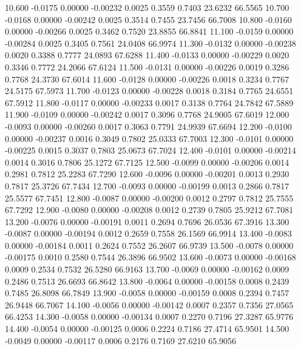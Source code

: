   10.600  -0.0175   0.00000  -0.00232   0.0025   0.3559   0.7403  23.6232  66.5565
  10.700  -0.0168   0.00000  -0.00242   0.0025   0.3514   0.7455  23.7456  66.7008
  10.800  -0.0160   0.00000  -0.00266   0.0025   0.3462   0.7520  23.8855  66.8841
  11.100  -0.0159   0.00000  -0.00284   0.0025   0.3405   0.7561  24.0408  66.9974
  11.300  -0.0132   0.00000  -0.00238   0.0020   0.3388   0.7777  24.0893  67.6288
  11.400  -0.0133   0.00000  -0.00229   0.0020   0.3346   0.7772  24.2066  67.6124
  11.500  -0.0131   0.00000  -0.00226   0.0019   0.3286   0.7768  24.3730  67.6014
  11.600  -0.0128   0.00000  -0.00226   0.0018   0.3234   0.7767  24.5175  67.5973
  11.700  -0.0123   0.00000  -0.00228   0.0018   0.3184   0.7765  24.6551  67.5912
  11.800  -0.0117   0.00000  -0.00233   0.0017   0.3138   0.7764  24.7842  67.5889
  11.900  -0.0109   0.00000  -0.00242   0.0017   0.3096   0.7768  24.9005  67.6019
  12.000  -0.0093   0.00000  -0.00260   0.0017   0.3063   0.7791  24.9939  67.6694
  12.200  -0.0100   0.00000  -0.00237   0.0016   0.3049   0.7802  25.0333  67.7003
  12.300  -0.0101   0.00000  -0.00225   0.0015   0.3037   0.7803  25.0673  67.7024
  12.400  -0.0101   0.00000  -0.00214   0.0014   0.3016   0.7806  25.1272  67.7125
  12.500  -0.0099   0.00000  -0.00206   0.0014   0.2981   0.7812  25.2283  67.7290
  12.600  -0.0096   0.00000  -0.00201   0.0013   0.2930   0.7817  25.3726  67.7434
  12.700  -0.0093   0.00000  -0.00199   0.0013   0.2866   0.7817  25.5577  67.7451
  12.800  -0.0087   0.00000  -0.00200   0.0012   0.2797   0.7812  25.7555  67.7292
  12.900  -0.0080   0.00000  -0.00208   0.0012   0.2739   0.7805  25.9212  67.7081
  13.200  -0.0076   0.00000  -0.00191   0.0011   0.2694   0.7696  26.0536  67.3916
  13.300  -0.0087   0.00000  -0.00194   0.0012   0.2659   0.7558  26.1569  66.9914
  13.400  -0.0083   0.00000  -0.00184   0.0011   0.2624   0.7552  26.2607  66.9739
  13.500  -0.0078   0.00000  -0.00175   0.0010   0.2580   0.7544  26.3896  66.9502
  13.600  -0.0073   0.00000  -0.00168   0.0009   0.2534   0.7532  26.5280  66.9163
  13.700  -0.0069   0.00000  -0.00162   0.0009   0.2486   0.7513  26.6693  66.8642
  13.800  -0.0064   0.00000  -0.00158   0.0008   0.2439   0.7485  26.8098  66.7849
  13.900  -0.0058   0.00000  -0.00159   0.0008   0.2394   0.7457  26.9448  66.7067
  14.100  -0.0056   0.00000  -0.00142   0.0007   0.2357   0.7356  27.0565  66.4253
  14.300  -0.0058   0.00000  -0.00134   0.0007   0.2270   0.7196  27.3287  65.9776
  14.400  -0.0054   0.00000  -0.00125   0.0006   0.2224   0.7186  27.4714  65.9501
  14.500  -0.0049   0.00000  -0.00117   0.0006   0.2176   0.7169  27.6210  65.9056

